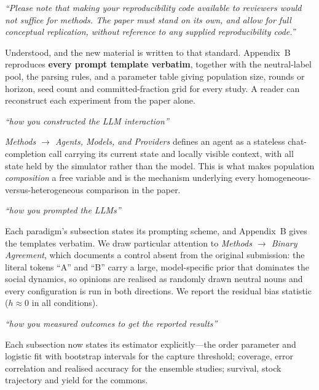 \documentclass[11pt,a4paper]{article}
\newenvironment{editorquote}
  {\par\medskip\noindent\begin{list}{}{%
     \setlength{\leftmargin}{2em}\setlength{\rightmargin}{1em}}\item[]%
     \color{black!72}\itshape}
  {\end{list}\medskip}
\begin{document}
\begin{editorquote}
``Please note that making your reproducibility code available to reviewers would
not suffice for methods. The paper must stand on its own, and allow for full
conceptual replication, without reference to any supplied reproducibility code.''
\end{editorquote}

Understood, and the new material is written to that standard. Appendix~B reproduces
\textbf{every prompt template verbatim}, together with the neutral-label pool, the
parsing rules, and a parameter table giving population size, rounds or horizon,
seed count and committed-fraction grid for every study. A reader can reconstruct
each experiment from the paper alone.

\begin{editorquote}
``how you constructed the LLM interaction''
\end{editorquote}

\emph{Methods $\to$ Agents, Models, and Providers} defines an agent as a stateless
chat-completion call carrying its current state and locally visible context, with
all state held by the simulator rather than the model. This is what makes
population \emph{composition} a free variable and is the mechanism underlying every
homogeneous-versus-heterogeneous comparison in the paper.

\begin{editorquote}
``how you prompted the LLMs''
\end{editorquote}

Each paradigm's subsection states its prompting scheme, and Appendix~B gives the
templates verbatim. We draw particular attention to \emph{Methods $\to$ Binary
Agreement}, which documents a control absent from the original submission: the
literal tokens ``A'' and ``B'' carry a large, model-specific prior that dominates
the social dynamics, so opinions are realised as randomly drawn neutral nouns and
every configuration is run in both directions. We report the residual bias
statistic ($h \approx 0$ in all conditions).

\begin{editorquote}
``how you measured outcomes to get the reported results''
\end{editorquote}

Each subsection now states its estimator explicitly---the order parameter and
logistic fit with bootstrap intervals for the capture threshold; coverage, error
correlation and realised accuracy for the ensemble studies; survival, stock
trajectory and yield for the commons.
\end{document}
